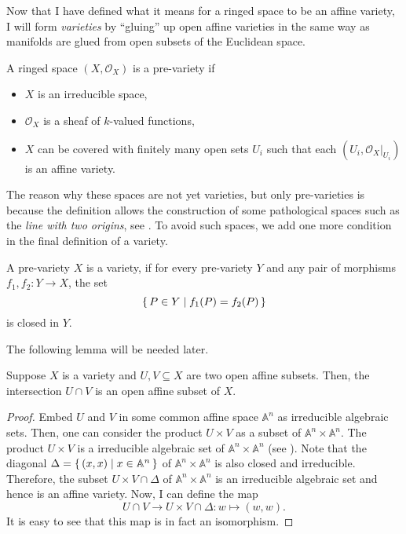 Now that I have defined what it means for a ringed space to be an affine
variety, I will form \emph{varieties} by ``gluing'' up open affine varieties
in the same way as manifolds are glued from open subsets of the Euclidean
space.
\begin{defin}
  A ringed space $(X,\mathscr{O}_{X})$ is a pre-variety if
  \begin{itemize}
    \item $X$ is an irreducible space,
    \item $\mathscr{O}_{X}$ is a sheaf of $k$-valued functions,
    \item $X$ can be covered with finitely many open sets $U_{i}$
          such that each $(U_{i},\mathscr{O}_{X}\vert_{U_{i}})$ is
          an affine variety.
  \end{itemize}
\end{defin}
The reason why these spaces are not yet varieties, but only pre-varieties
is because the definition allows the construction of some pathological
spaces such as the \emph{line with two origins}, see \cite{gathmann}.
To avoid such spaces, we add one more condition in the final definition
of a variety. %
\begin{defin}
  A pre-variety $X$ is a variety, if for every pre-variety $Y$ and any
  pair of morphisms $f_{1}, f_{2}: Y\to X$, the set
  \[\set{P\in Y\mid f_{1}(P)=f_{2}(P)}\]
  is closed in $Y$.
\end{defin}
The following lemma will be needed later.
\begin{lemm}\label{lemm:affine_intersection}
  Suppose $X$ is a variety and $U, V\subseteq X$ are two open affine subsets.
  Then, the intersection $U\cap V$ is an open affine subset of $X$.
\end{lemm}
\begin{proof}
  Embed $U$ and $V$ in some common affine space $\mathbb{A}^{n}$ as
  irreducible algebraic sets. Then, one can consider the product $U\times V$
  as a subset of $\mathbb{A}^{n}\times\mathbb{A}^{n}$. The product
  $U\times V$ is a irreducible algebraic set of
  $\mathbb{A}^{n}\times\mathbb{A}^{n}$ (see \cite{gathmann}). Note that the
  diagonal $\Delta =\set{(x,x)\mid x\in\mathbb{A}^{n}}$ of
  $\mathbb{A}^{n}\times\mathbb{A}^{n}$ is also closed and irreducible.
  Therefore, the subset $U\times V\cap\Delta$ of
  $\mathbb{A}^{n}\times\mathbb{A}^{n}$ is an irreducible algebraic set and
  hence is an affine variety. Now, I can define the map
  \[
    U\cap V\to U\times V\cap\Delta: w\mapsto (w,w).
  \]
  It is easy to see that this map is in fact an isomorphism.
\end{proof}

